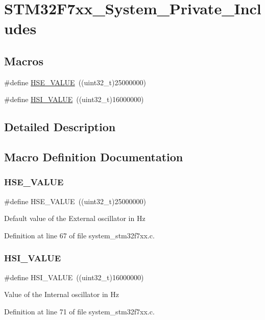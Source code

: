 \hypertarget{group__STM32F7xx__System__Private__Includes}{}\section{S\+T\+M32\+F7xx\+\_\+\+System\+\_\+\+Private\+\_\+\+Includes}
\label{group__STM32F7xx__System__Private__Includes}
\subsection*{Macros}
\begin{DoxyCompactItemize}
\item 
\#define \mbox{\hyperlink{group__STM32F7xx__System__Private__Includes_gaeafcff4f57440c60e64812dddd13e7cb}{H\+S\+E\+\_\+\+V\+A\+L\+UE}}~((uint32\+\_\+t)25000000)
\item 
\#define \mbox{\hyperlink{group__STM32F7xx__System__Private__Includes_gaaa8c76e274d0f6dd2cefb5d0b17fbc37}{H\+S\+I\+\_\+\+V\+A\+L\+UE}}~((uint32\+\_\+t)16000000)
\end{DoxyCompactItemize}


\subsection{Detailed Description}


\subsection{Macro Definition Documentation}
\mbox{\label{group__STM32F7xx__System__Private__Includes_gaeafcff4f57440c60e64812dddd13e7cb}} 
\subsubsection{\texorpdfstring{HSE\_VALUE}{HSE\_VALUE}}
{\footnotesize\ttfamily \#define H\+S\+E\+\_\+\+V\+A\+L\+UE~((uint32\+\_\+t)25000000)}

Default value of the External oscillator in Hz 

Definition at line 67 of file system\+\_\+stm32f7xx.\+c.

\mbox{\label{group__STM32F7xx__System__Private__Includes_gaaa8c76e274d0f6dd2cefb5d0b17fbc37}} 
\subsubsection{\texorpdfstring{HSI\_VALUE}{HSI\_VALUE}}
{\footnotesize\ttfamily \#define H\+S\+I\+\_\+\+V\+A\+L\+UE~((uint32\+\_\+t)16000000)}

Value of the Internal oscillator in Hz 

Definition at line 71 of file system\+\_\+stm32f7xx.\+c.

